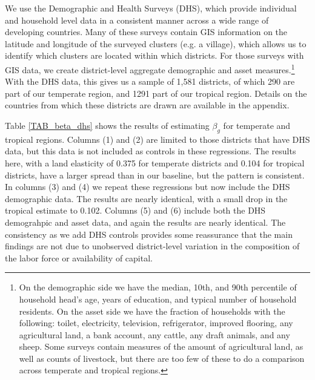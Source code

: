 \documentclass[11pt]{article}
\begin{document}
We use the Demographic and Health Surveys (DHS), which provide individual and household level data in a consistent manner across a wide range of developing countries. Many of these surveys contain GIS information on the latitude and longitude of the surveyed clusters (e.g. a village), which allows us to identify which clusters are located within which districts. For those surveys with GIS data, we create district-level aggregate demographic and asset measures.\footnote{On the demographic side we have the median, 10th, and 90th percentile of household head's age, years of education, and typical number of household residents. On the asset side we have the fraction of households with the following: toilet, electricity, television, refrigerator, improved flooring, any agricultural land, a bank account, any cattle, any draft animals, and any sheep. Some surveys contain measures of the amount of agricultural land, as well as counts of livestock, but there are too few of these to do a comparison across temperate and tropical regions.} With the DHS data, this gives us a sample of 1,581 districts, of which 290 are part of our temperate region, and 1291 part of our tropical region. Details on the countries from which these districts are drawn are available in the appendix.

Table \ref{TAB_beta_dhs} shows the results of estimating $\beta_g$ for temperate and tropical regions. Columns (1) and (2) are limited to those districts that have DHS data, but this data is not included as controls in these regressions. The results here, with a land elasticity of 0.375 for temperate districts and 0.104 for tropical districts, have a larger spread than in our baseline, but the pattern is consistent. In columns (3) and (4) we repeat these regressions but now include the DHS demographic data. The results are nearly identical, with a small drop in the tropical estimate to 0.102. Columns (5) and (6) include both the DHS demograhpic and asset data, and again the results are nearly identical. The consistency as we add DHS controls provides some reassurance that the main findings are not due to unobserved district-level variation in the composition of the labor force or availability of capital.
\end{document}
